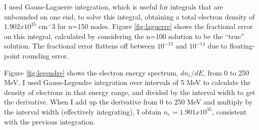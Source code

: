\documentclass{article}
\begin{document}
I used Gauss-Laguerre integration, which is useful for integrals that are unbounded on one end, to solve this
integral, obtaining a total electron density of $1.902x10^{35}$ cm${^-3}$ for n=150 nodes.  Figure
\ref{fig:laguerre} shows the fractional error on this integral, calculated by considering the n=100 solution
to be the ``true'' solution.  The fractional error flattens off between $10^{-13}$ and $10^{-14}$ due to
floating-point rounding error.

Figure \ref{fig:legendre} shows the electron energy spectrum, $dn_e/dE$, from 0 to 250 MeV.  I used Gauss-Legendre
integration over intervals of 5 MeV to calculate the density of electrons in that energy range, and divided by the
interval width to get the derivative.  When I add up the derivative from 0 to 250 MeV and multiply by the interval width (effectively integrating), I obtain $n_e = 1.901x10^{35}$, consistent with the previous integration.
\end{document}
